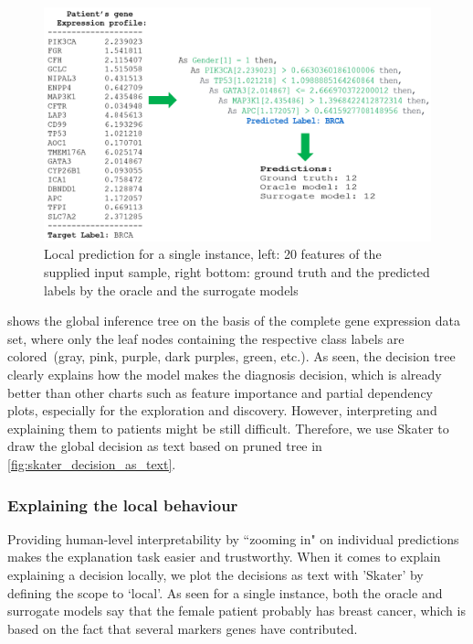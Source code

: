 \begin{figure}[h]
	\centering
		\includegraphics[scale=0.9]{images/single_pred_feature.png}
	    \caption[Local prediction for a single instance.]{Local prediction for a single instance, left: 20 features of the supplied input sample, right bottom: ground truth and the predicted labels by the oracle and the surrogate models}
	    \label{fig:decision_as_text_local_1}
\end{figure}

\hspace*{3.5mm}  shows the global inference tree on the basis of the complete gene expression data set, where only the leaf nodes containing the respective class labels are colored~(gray, pink, purple, dark purples, green, etc.). As seen, the decision tree clearly explains how the model makes the diagnosis decision, which is already better than other charts such as feature importance and partial dependency plots, especially for the exploration and discovery. However, interpreting and explaining them to patients might be still difficult. Therefore, we use Skater to draw the global decision as text based on pruned tree in \cref{fig:skater_decision_as_text}. %

\subsubsection{Explaining the local behaviour}
Providing human-level interpretability by ``zooming in" on individual predictions makes the explanation task easier and trustworthy\cite{ribeiro2018anchors}. When it comes to explain explaining a decision locally, we plot the decisions as text with 'Skater' by defining the scope to `local'. As seen for a single instance, both the oracle and surrogate models say that the female patient probably has breast cancer, which is based on the fact that several markers genes have contributed. 

